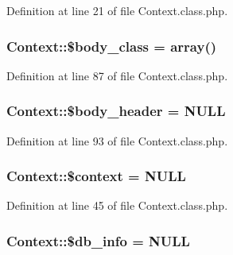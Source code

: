 Definition at line 21 of file Context.\+class.\+php.

\subsubsection[{\texorpdfstring{\$body\+\_\+class}{$body_class}}]{\setlength{\rightskip}{0pt plus 5cm}Context\+::\$body\+\_\+class = array()}\hypertarget{classContext_af0bb833a3157d6d2153d7858cb60e435}{}\label{classContext_af0bb833a3157d6d2153d7858cb60e435}


Definition at line 87 of file Context.\+class.\+php.

\subsubsection[{\texorpdfstring{\$body\+\_\+header}{$body_header}}]{\setlength{\rightskip}{0pt plus 5cm}Context\+::\$body\+\_\+header = N\+U\+LL}\hypertarget{classContext_aa2c90f49a1f6389eadea8962d0fbf5b3}{}\label{classContext_aa2c90f49a1f6389eadea8962d0fbf5b3}


Definition at line 93 of file Context.\+class.\+php.

\subsubsection[{\texorpdfstring{\$context}{$context}}]{\setlength{\rightskip}{0pt plus 5cm}Context\+::\$context = N\+U\+LL}\hypertarget{classContext_a39e9103dacbca5e5fa49d6e93f0ccec3}{}\label{classContext_a39e9103dacbca5e5fa49d6e93f0ccec3}


Definition at line 45 of file Context.\+class.\+php.

\subsubsection[{\texorpdfstring{\$db\+\_\+info}{$db_info}}]{\setlength{\rightskip}{0pt plus 5cm}Context\+::\$db\+\_\+info = N\+U\+LL}\hypertarget{classContext_a6f4d307bdcb4bfd83fda27bc265977eb}{}\label{classContext_a6f4d307bdcb4bfd83fda27bc265977eb}


